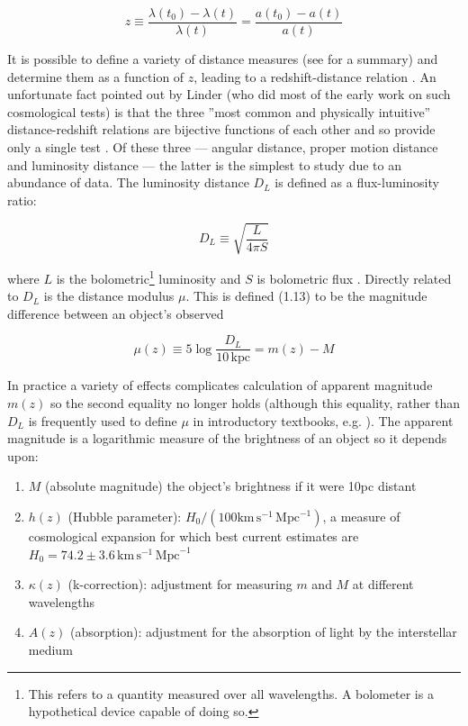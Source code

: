 \begin{equation}
    z \equiv \frac{ \lambda{}(t_0) - \lambda{}(t)}{\lambda{}(t)}
    = \frac{a(t_0) - a(t)}{a(t)}
\label{eq:1.11}
\end{equation}

It is possible to define a variety of distance measures (see \cite{Hogg2000} for a summary) and determine them as a function of $z$, leading to a redshift-distance relation \cite{Linder1988a}. An unfortunate fact pointed out by Linder (who did most of the early work on such cosmological tests) is that the three ”most common and physically intuitive” distance-redshift relations are bijective functions of each other and so provide only a single test \cite{Linder1988a}. Of these three --- angular distance, proper motion distance and luminosity distance --- the latter is the simplest to study due to an abundance of data. 
The luminosity distance $D_L$ is defined as a flux-luminosity ratio:

\begin{equation}
D_{L} \equiv \sqrt{\frac{L}{4\pi{}S}}
\label{eq:1.12}
\end{equation}

where $L$ is the bolometric\footnote{This refers to a quantity measured over all wavelengths. A bolometer is a hypothetical device capable of doing so.} luminosity and $S$ is bolometric flux \cite{Hogg2000}. Directly related to $D_L$ is the distance modulus $\mu$. This is defined (1.13) to be the magnitude difference between an object’s observed

\begin{equation}
    \mu{}(z) \equiv 5 \log{} \frac{D_{L}}{10\,\text{kpc}}
    = m(z) - M
\label{eq:1.13}
\end{equation}

In practice a variety of effects complicates calculation of apparent magnitude $m(z)$ so the second equality no longer holds \cite{Linder1988a} (although this equality, rather than $D_L$ is frequently used to define $\mu$ in introductory textbooks, e.g. \cite{Silk1989}). The apparent magnitude is a logarithmic measure of the brightness of an object so it depends upon:

\begin{enumerate}
\item $M$ (absolute magnitude) the object’s brightness if it were 10pc distant
\item $h(z)$ (Hubble parameter): $H_0 / (100 \mathrm{km}\,\mathrm{s}^{-1} \,\mathrm{Mpc}^{-1})$, a measure of cosmological expansion for which best current estimates \cite{Riess2009} are $H_0 = 74.2 \pm 3.6 \,\mathrm{km}\,\mathrm{s}^{-1} \,\mathrm{Mpc}^{-1}$
\item $\kappa(z)$ (k-correction): adjustment for measuring $m$ and $M$ at different wavelengths
\item $A(z)$ (absorption): adjustment for the absorption of light by the interstellar medium
\end{enumerate}

